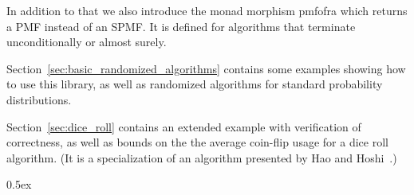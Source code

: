 \documentclass[11pt,a4paper]{article}
\begin{document}
In addition to that we also introduce the monad morphism 
{pmf{\isacharunderscore}of{\isacharunderscore}ra} which returns a PMF instead of an SPMF. It is
defined for algorithms that terminate unconditionally or almost surely.

Section~\ref{sec:basic_randomized_algorithms} contains some examples showing how to use this library,
as well as randomized algorithms for standard probability distributions.

Section~\ref{sec:dice_roll} contains an extended example with verification of correctness, as well
as bounds on the the average coin-flip usage for a dice roll algorithm. (It is a 
specialization of an algorithm presented by Hao and Hoshi~\cite{hao1997}.)

\parindent 0pt\parskip 0.5ex





\end{document}
